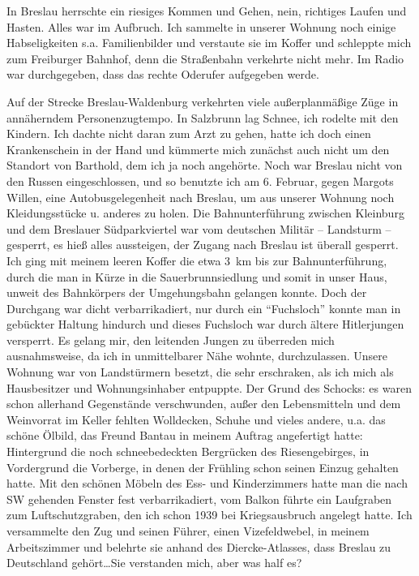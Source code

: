 In Breslau herrschte ein riesiges Kommen und Gehen, nein, richtiges Laufen und Hasten. Alles war im Aufbruch. Ich sammelte in unserer Wohnung noch einige Habseligkeiten s.a. Familienbilder und verstaute sie im Koffer und schleppte mich zum Freiburger Bahnhof, denn die Straßenbahn verkehrte nicht mehr. Im Radio war durchgegeben, dass das rechte Oderufer aufgegeben werde.

Auf der Strecke Breslau-Waldenburg verkehrten viele außerplanmäßige Züge in annäherndem Personenzugtempo. In Salzbrunn lag Schnee, ich rodelte mit den Kindern. Ich dachte nicht daran zum Arzt zu gehen, hatte ich doch einen Krankenschein in der Hand und kümmerte mich zunächst auch nicht um den Standort von Barthold, dem ich ja noch angehörte. Noch war Breslau nicht von den Russen eingeschlossen, und so benutzte ich am 6. Februar, gegen Margots Willen, eine Autobusgelegenheit nach Breslau,  um aus unserer Wohnung noch Kleidungsstücke u. anderes zu holen. Die Bahnunterführung zwischen Kleinburg und dem Breslauer Südparkviertel war vom deutschen Militär -- Landsturm -- gesperrt, es hieß alles aussteigen, der Zugang nach Breslau ist überall gesperrt. Ich ging mit meinem leeren Koffer die etwa 3~km bis zur Bahnunterführung, durch die man in Kürze in die Sauerbrunnsiedlung und somit in unser Haus, unweit des Bahnkörpers der Umgehungsbahn gelangen konnte. Doch der Durchgang war dicht verbarrikadiert, nur durch ein \enquote{Fuchsloch} konnte man in gebückter Haltung hindurch und dieses Fuchsloch war durch ältere Hitlerjungen versperrt. Es gelang mir, den leitenden Jungen zu überreden mich ausnahmsweise, da ich in unmittelbarer Nähe wohnte, durchzulassen. Unsere Wohnung war von Landstürmern besetzt, die sehr erschraken, als ich mich als Hausbesitzer und Wohnungsinhaber entpuppte. Der Grund des Schocks: es waren schon allerhand Gegenstände verschwunden, außer den Lebensmitteln und dem Weinvorrat im Keller fehlten Wolldecken, Schuhe und vieles andere, u.a. das schöne Ölbild, das Freund Bantau in meinem Auftrag angefertigt hatte: Hintergrund die noch schneebedeckten Bergrücken des Riesengebirges, in Vordergrund die Vorberge, in denen der Frühling schon seinen  Einzug gehalten hatte. Mit den schönen Möbeln des Ess- und Kinderzimmers hatte man die nach SW gehenden Fenster fest verbarrikadiert, vom Balkon führte ein Laufgraben zum Luftschutzgraben, den ich schon 1939 bei Kriegsausbruch angelegt hatte. Ich versammelte den Zug und seinen Führer, einen Vizefeldwebel, in meinem Arbeitszimmer und belehrte sie anhand des Diercke-Atlasses, dass Breslau zu Deutschland gehört\dots Sie verstanden mich, aber was half es?

